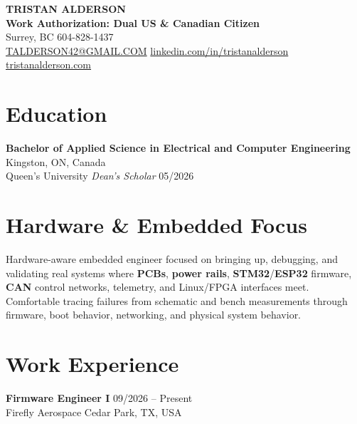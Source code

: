 \documentclass[letterpaper,10pt]{article}
\begin{document}
    \begin{center}
        {\Huge \textbf{\color{deepblue} TRISTAN ALDERSON}} \\
        \textbf{\color{deepblue} Work Authorization: Dual US \& Canadian Citizen} \\
        \vspace{4pt}
        Surrey, BC \textbullet{} 604-828-1437 \\
        \href{mailto:TALDERSON42@GMAIL.COM}{TALDERSON42@GMAIL.COM} \textbullet{}
        \href{https://www.linkedin.com/in/tristanalderson/}{linkedin.com/in/tristanalderson} \textbullet{}
        \href{https://tristanalderson.com/}{tristanalderson.com} \\
    \end{center}

    \section{Education}
    \noindent \textbf{Bachelor of Applied Science in Electrical and Computer Engineering} \hfill Kingston, ON, Canada \\
    Queen's University \textbullet{} \textit{Dean's Scholar} \hfill 05/2026

    \section{Hardware \& Embedded Focus}
    \noindent Hardware-aware embedded engineer focused on bringing up, debugging, and validating real systems where \textbf{PCBs}, \textbf{power rails}, \textbf{STM32}/\textbf{ESP32} firmware, \textbf{CAN} control networks, telemetry, and Linux/FPGA interfaces meet. Comfortable tracing failures from schematic and bench measurements through firmware, boot behavior, networking, and physical system behavior.

    \section{Work Experience}

    \noindent \textbf{Firmware Engineer I} \hfill 09/2026 -- Present \\
    Firefly Aerospace \hfill Cedar Park, TX, USA
\end{document}
